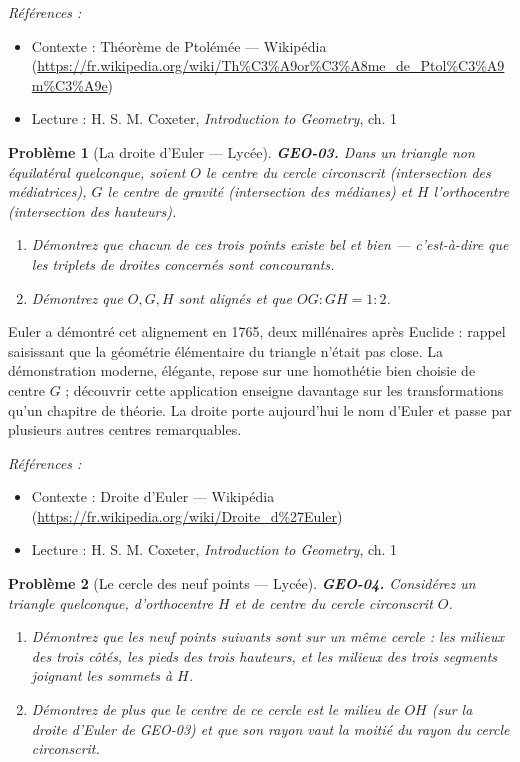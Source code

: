 \documentclass[11pt]{article}
\newtheorem{problem}{Problème}
\newenvironment{refs}{\par\small\noindent\emph{Références :}\begin{itemize}\setlength\itemsep{0pt}}{\end{itemize}\normalsize}
\begin{document}
\begin{refs}
\item Contexte : Théorème de Ptolémée --- Wikipédia (\url{https://fr.wikipedia.org/wiki/Th%C3%A9or%C3%A8me_de_Ptol%C3%A9m%C3%A9e})
\item Lecture : H. S. M. Coxeter, \textit{Introduction to Geometry}, ch. 1
\end{refs}

\bigskip

\begin{problem}[{La droite d'Euler --- Lycée}]
\textbf{GEO-03.} Dans un triangle non équilatéral quelconque, soient $ O $ le centre du
cercle circonscrit (intersection des médiatrices), $ G $ le centre de gravité (intersection
des médianes) et $ H $ l'orthocentre (intersection des hauteurs).
\begin{enumerate}
\item[(a)] Démontrez que chacun de ces trois points existe bel et bien --- c'est-à-dire que les triplets
de droites concernés sont concourants.
\item[(b)] Démontrez que $ O, G, H $ sont alignés et que $ OG : GH = 1 : 2 $.
\end{enumerate}

\end{problem}

\noindent Euler a démontré cet alignement en 1765, deux millénaires après Euclide :
rappel saisissant que la géométrie élémentaire du triangle n'était pas close. La démonstration
moderne, élégante, repose sur une homothétie bien choisie de centre $ G $ ; découvrir cette
application enseigne davantage sur les transformations qu'un chapitre de théorie. La droite
porte aujourd'hui le nom d'Euler et passe par plusieurs autres centres remarquables.

\begin{refs}
\item Contexte : Droite d'Euler --- Wikipédia (\url{https://fr.wikipedia.org/wiki/Droite_d%27Euler})
\item Lecture : H. S. M. Coxeter, \textit{Introduction to Geometry}, ch. 1
\end{refs}

\bigskip

\begin{problem}[{Le cercle des neuf points --- Lycée}]
\textbf{GEO-04.} Considérez un triangle quelconque, d'orthocentre $ H $ et de centre du
cercle circonscrit $ O $.
\begin{enumerate}
\item[(a)] Démontrez que les neuf points suivants sont sur un même cercle : les milieux des trois
côtés, les pieds des trois hauteurs, et les milieux des trois segments joignant les sommets
à $ H $.
\item[(b)] Démontrez de plus que le centre de ce cercle est le milieu de $ OH $ (sur la droite
d'Euler de GEO-03) et que son rayon vaut la moitié du rayon du cercle circonscrit.
\end{enumerate}

\end{problem}
\end{document}
